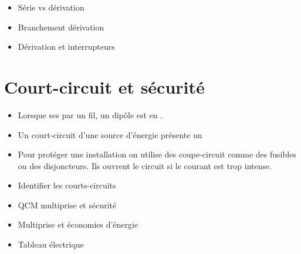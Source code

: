 \documentclass[12pt,a4paper]{article}
\begin{document}
\begin{myexos}
	\begin{itemize}
		\item {} Série vs dérivation
		\item {} Branchement dérivation
		\item {} Dérivation et interrupteurs
	\end{itemize}
\end{myexos}


\section{Court-circuit et sécurité}

\begin{mybilan}
	\begin{itemize}
		\item Lorsque ses  par un fil, un dipôle est en .
		\item Un court-circuit d'une source d'énergie présente un 
		
		\item Pour protéger une installation on utilise des coupe-circuit comme des fusibles ou des disjoncteurs. Ils ouvrent le circuit si le courant est trop intense.
	\end{itemize}
\end{mybilan}

\begin{myexos}
	\begin{itemize}
		\item {} Identifier les courts-circuits
		\item {} QCM multiprise et sécurité
		\item {} Multiprise et économies d'énergie
		\item {} Tableau électrique
	\end{itemize}
	
	
\end{myexos}
\end{document}
